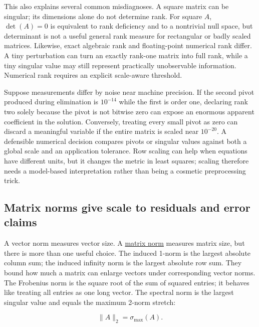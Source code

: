 This also explains several common misdiagnoses. A square matrix can be singular; its dimensions alone do not determine rank. For square \(A\), \(\det(A)=0\) is equivalent to rank deficiency and to a nontrivial null space, but determinant is not a useful general rank measure for rectangular or badly scaled matrices. Likewise, exact algebraic rank and floating-point numerical rank differ. A tiny perturbation can turn an exactly rank-one matrix into full rank, while a tiny singular value may still represent practically unobservable information. Numerical rank requires an explicit scale-aware threshold.

Suppose measurements differ by noise near machine precision. If the second pivot produced during elimination is \(10^{-14}\) while the first is order one, declaring rank two solely because the pivot is not bitwise zero can expose an enormous apparent coefficient in the solution. Conversely, treating every small pivot as zero can discard a meaningful variable if the entire matrix is scaled near \(10^{-20}\). A defensible numerical decision compares pivots or singular values against both a global scale and an application tolerance. Row scaling can help when equations have different units, but it changes the metric in least squares; scaling therefore needs a model-based interpretation rather than being a cosmetic preprocessing trick.

\subsection{Matrix norms give scale to residuals and error claims}\label{01-foundations-i-ch019-matrix-norms-give-scale-to-residuals-and-error-claims}

\hypertarget{01-foundations-i-ch019-matrix-norms-give-scale-to-residuals-and-error-claims}{}

A vector norm measures vector size. A \hyperref[01-foundations-i-ch019-matrix-norms-put-scale-into-error-statements]{matrix norm} measures matrix size, but there is more than one useful choice. The induced 1-norm is the largest absolute column sum; the induced infinity norm is the largest absolute row sum. They bound how much a matrix can enlarge vectors under corresponding vector norms. The Frobenius norm is the square root of the sum of squared entries; it behaves like treating all entries as one long vector. The spectral norm is the largest singular value and equals the maximum 2-norm stretch:

\[
\|A\|_2=\sigma_{\max}(A).
\]

